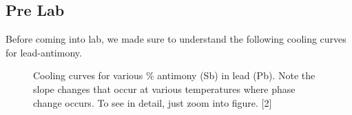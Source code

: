 \documentclass{article}
\begin{document}
\subsection{Pre Lab}
Before coming into lab, we made sure to understand the following cooling curves for lead-antimony.
\begin{figure}[H]
\centering
{}
\caption{Cooling curves for various \% antimony (Sb) in lead (Pb). Note the slope changes that occur at various temperatures where phase change occurs. To see in detail, just zoom into figure. [2]}
\label{fig:ccoriginal}
\end{figure}
\end{document}
